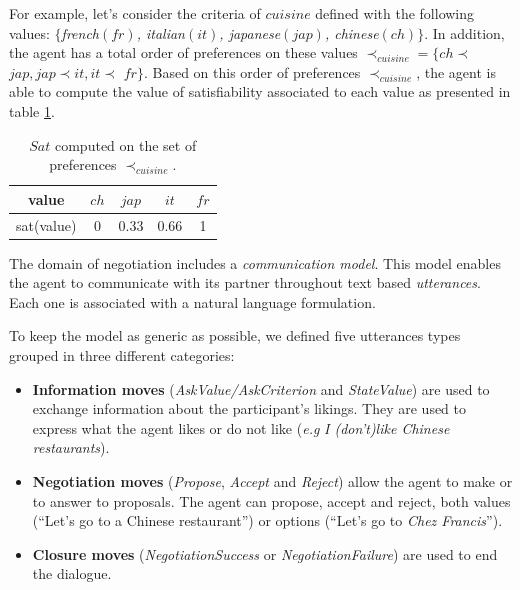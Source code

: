 \documentclass[conference, letterpaper]{IEEEtran}
\begin{document}
	 
	For example, let's consider the criteria of $cuisine$ defined with the following values: $\{$\emph{french$(fr)$, italian$(it)$, japanese$(jap)$, chinese$(ch)$}$\}$. In addition, the agent has a total order of preferences on these values $\prec_{cuisine}$$=\{ch$$\prec$$jap, jap$$\prec$$it, it$$\prec$ $fr\}$. Based on this order of preferences $\prec_{cuisine}$, the agent is able to compute the value of satisfiability associated to each value as presented in table \ref{tab:sat}.
	
	\begin{table} [h]
		\centering
				\large
		\begin{tabular}{ |c|c|c|c|c| }
		\hline
		value & $ch$ & $jap$ & $it$ & $fr$ \\	
		\hline
		sat(value) & 0 & 0.33 & 0.66 & 1 \\
		\hline
	\end{tabular}
		\caption{$Sat$ computed on the set of preferences $\prec_{cuisine}$.}
		\label{tab:sat}

	\end{table}


	
	The domain of negotiation includes a \emph{communication model}. This model enables the agent to communicate with its partner throughout text based \textit{utterances}. 
	Each one is associated with a natural language formulation.%
	
	To keep the model as generic as possible, we defined five utterances types grouped in three different categories: 
	\begin{itemize}
			\item \textbf{Information moves} (\textit{AskValue/AskCriterion} and \textit{StateValue}) are used to exchange information about the participant's likings. They are used to express what the agent likes or do not like (\emph{e.g} \textit{I (don't)like Chinese restaurants}).
			
			\item 	\textbf{Negotiation moves} (\textit{Propose}, \textit{Accept} and \textit{Reject}) allow the agent to make or to answer to proposals. The agent can propose, accept and reject, both values (``Let's go to a Chinese restaurant'') or options (``Let's go to \emph{Chez Francis}'').	
			
			\item 	\textbf{Closure moves} (\textit{NegotiationSuccess} or \textit{NegotiationFailure}) are used to end the dialogue.
	\end{itemize}
\end{document}
